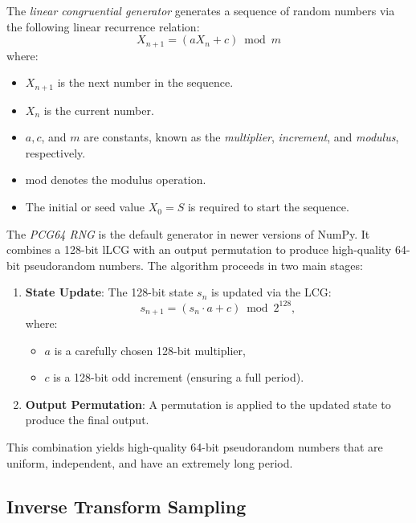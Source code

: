 \documentclass[11pt, headings=standardclasses, parskip=half, twoside]{scrartcl}
\begin{document}
\begin{example}
    The \textit{linear congruential generator} generates a sequence of random numbers via the following linear recurrence relation:
    \[
    X_{n+1}=\left(a X_{n}+c\right) \bmod m
    \]
    where:
    \begin{itemize}[before={\parskip=0pt}, nosep]
        \item $X_{n+1}$ is the next number in the sequence.
        \item $X_{n}$ is the current number.
        \item $a, c$, and $m$ are constants, known as the \textit{multiplier}, \textit{increment}, and \textit{modulus}, respectively.
        \item mod denotes the modulus operation.
        \item The initial or seed value $X_{0}=S$ is required to start the sequence. \qedhere
    \end{itemize}
\end{example}

\begin{example}
    The \textit{PCG64 RNG} is the default generator in newer versions of NumPy. 
    It combines a 128-bit lLCG with an output permutation to produce high-quality 64-bit pseudorandom numbers. 
    The algorithm proceeds in two main stages:
    \begin{enumerate}
        \item \textbf{State Update}: The 128-bit state $s_{n}$ is updated via the LCG:
        \[
        s_{n+1}=\left(s_{n} \cdot a+c\right) \bmod 2^{128},
        \]
        where:
        \begin{itemize}[before={\parskip=0pt}, nosep]
            \item $a$ is a carefully chosen 128-bit multiplier,
            \item $c$ is a 128-bit odd increment (ensuring a full period).
        \end{itemize}
        \item \textbf{Output Permutation}: A permutation is applied to the updated state to produce the final output.
    \end{enumerate}
    This combination yields high-quality 64-bit pseudorandom numbers that are uniform, independent, and have an extremely long period. 
\end{example}




\subsection{Inverse Transform Sampling}
\end{document}
